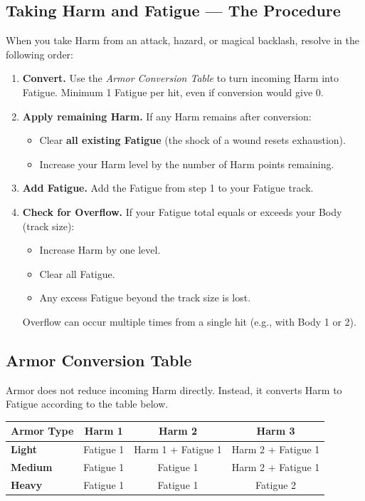 \subsection{Taking Harm and Fatigue --- The Procedure}

When you take Harm from an attack, hazard, or magical backlash, resolve in the following order:

\begin{enumerate}
  \item \textbf{Convert.} Use the \textit{Armor Conversion Table} to turn incoming Harm into Fatigue. Minimum 1 Fatigue per hit, even if conversion would give 0.
  \item \textbf{Apply remaining Harm.} If any Harm remains after conversion:
    \begin{itemize}
      \item Clear \textbf{all existing Fatigue} (the shock of a wound resets exhaustion).
      \item Increase your Harm level by the number of Harm points remaining.
    \end{itemize}
  \item \textbf{Add Fatigue.} Add the Fatigue from step 1 to your Fatigue track.
  \item \textbf{Check for Overflow.} If your Fatigue total equals or exceeds your Body (track size):
    \begin{itemize}
      \item Increase Harm by one level.
      \item Clear all Fatigue.
      \item Any excess Fatigue beyond the track size is lost.
    \end{itemize}
    Overflow can occur multiple times from a single hit (e.g., with Body 1 or 2).
\end{enumerate}

\subsection{Armor Conversion Table}

Armor does not reduce incoming Harm directly. Instead, it converts Harm to Fatigue according to the table below.

\begin{tabular}{@{}lccc@{}}
\toprule
\textbf{Armor Type} & \textbf{Harm 1} & \textbf{Harm 2} & \textbf{Harm 3} \\
\midrule
\textbf{Light}   & Fatigue 1            & Harm 1 + Fatigue 1   & Harm 2 + Fatigue 1 \\
\textbf{Medium}  & Fatigue 1            & Fatigue 1            & Harm 2 + Fatigue 1 \\
\textbf{Heavy}   & Fatigue 1            & Fatigue 1            & Fatigue 2 \\
\bottomrule
\end{tabular}

